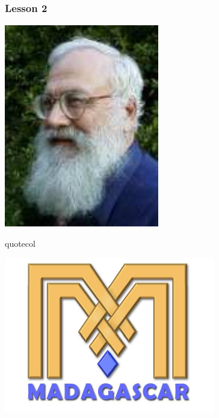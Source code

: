 \begin{frame}
  \MadLogo
  \frametitle{Lesson 2}
{\flushright
  \includegraphics[height=0.2\textheight]{Fig/Claerbout}
  } 
\vfill
\begin{beamercolorbox}[wd=\textwidth,center]{quotecol}
\Large {}
\end{beamercolorbox}
\vfill

\end{frame}

\begin{frame}
  \begin{center}
 \includegraphics[height=0.5\textheight]{Fig/MadLogo} \\
 {} \\
 {} 
  \end{center}
\end{frame}


